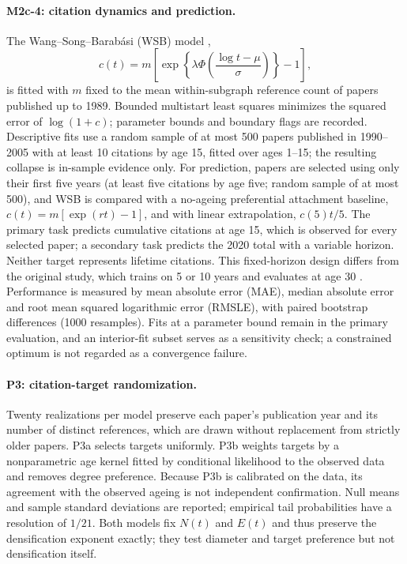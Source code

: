\paragraph{M2c-4: citation dynamics and prediction.}
The Wang--Song--Barab\'asi (WSB) model \citep{wang2013quantifying},
\begin{equation}
 c(t)=m\left[\exp\!\left\{\lambda\Phi\left(\frac{\log t-\mu}{\sigma}\right)\right\}-1\right],
\end{equation}
is fitted with $m$ fixed to the mean within-subgraph reference count of papers published
up to 1989. Bounded multistart least squares minimizes the squared error of $\log(1+c)$;
parameter bounds and boundary flags are recorded. Descriptive fits use a random sample of
at most 500 papers published in 1990--2005 with at least 10 citations by age 15, fitted
over ages 1--15; the resulting collapse is in-sample evidence only. For prediction,
papers are selected using only their first five years (at least five citations by age
five; random sample of at most 500), and WSB is compared with a no-ageing preferential
attachment baseline, $c(t)=m[\exp(rt)-1]$, and with linear extrapolation, $c(5)t/5$. The
primary task predicts cumulative citations at age 15, which is observed for every selected
paper; a secondary task predicts the 2020 total with a variable horizon. Neither target
represents lifetime citations. This fixed-horizon design differs from the original study,
which trains on 5 or 10 years and evaluates at age 30 \citep{wang2013quantifying}.
Performance is measured by mean absolute error (MAE), median absolute error and root mean
squared logarithmic error (RMSLE), with paired bootstrap differences (1000 resamples). Fits
at a parameter bound remain in the primary evaluation, and an interior-fit subset serves
as a sensitivity check; a constrained optimum is not regarded as a convergence failure.

\paragraph{P3: citation-target randomization.}
Twenty realizations per model preserve each paper's publication year and its number of
distinct references, which are drawn without replacement from strictly older papers. P3a
selects targets uniformly. P3b weights targets by a nonparametric age kernel fitted by
conditional likelihood to the observed data and removes degree preference. Because P3b is
calibrated on the data, its agreement with the observed ageing is not independent
confirmation. Null means and sample standard deviations are reported; empirical tail
probabilities have a resolution of $1/21$. Both models fix $N(t)$ and $E(t)$ and thus
preserve the densification exponent exactly; they test diameter and target preference but
not densification itself.
